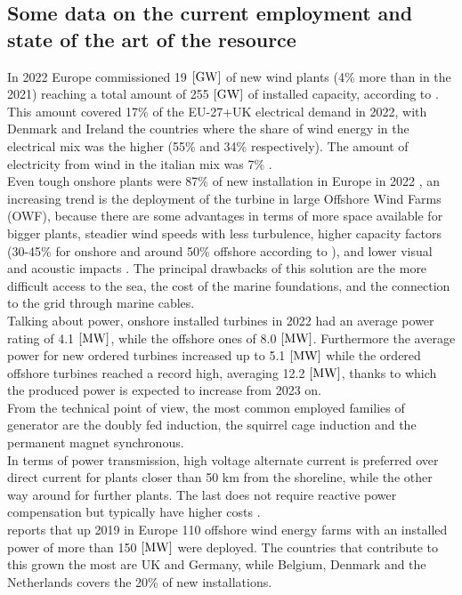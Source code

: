 \subsection{Some data on the current employment and state of the art of the resource}
In 2022 Europe commissioned 19 $\left[\si{\giga\watt}\right]$ of new wind plants (4\% more than in the 2021) reaching a total amount of 255 $\left[\si{\giga\watt}\right]$ of installed capacity, according to \cite{wind_europe_data_2022}. This amount covered 17\% of the EU-27+UK electrical demand in 2022, with Denmark and Ireland the countries where the share of wind energy in the electrical mix was the higher (55\% and 34\% respectively). The amount of electricity from wind in the italian mix was 7\% \cite{wind_europe_data_2022}.\\
Even tough onshore plants were 87\% of new installation in Europe in 2022 \cite{wind_europe_data_2022}, an increasing trend is the deployment of the turbine in large Offshore Wind Farms (OWF), because there are some advantages in terms of more space available for bigger plants, steadier wind speeds with less turbulence, higher capacity factors (30-45\% for onshore and around 50\% offshore according to \cite{wind_europe_data_2022}), and lower visual and acoustic impacts \cite{current_staus_and_future_trends_of_offshore_wind_power_in_europe}. The principal drawbacks of this solution are the more difficult access to the sea, the cost of the marine foundations, and the connection to the grid through marine cables.  \\
Talking about power, onshore installed turbines in 2022 had an average power rating of 4.1 $\left[\si{\mega\watt}\right]$, while the offshore ones of 8.0 $\left[\si{\mega\watt}\right]$. Furthermore the average power for new ordered turbines increased up to 5.1 $\left[\si{\mega\watt}\right]$ while the ordered offshore turbines reached a record high, averaging 12.2 $\left[\si{\mega\watt}\right]$, thanks to which the produced power is expected to increase from 2023 on.\\

From the technical point of view, the most common employed families of generator are the doubly fed induction, the squirrel cage induction and the permanent magnet synchronous.\\
In terms of power transmission, high voltage alternate current is preferred over direct current for plants closer than 50 km from the shoreline, while the other way around for further plants. The last does not require reactive power compensation but typically have higher costs \cite{current_staus_and_future_trends_of_offshore_wind_power_in_europe}.\\
\cite{current_staus_and_future_trends_of_offshore_wind_power_in_europe} reports that up 2019 in Europe 110 offshore wind energy farms with an installed power of more than 150 $\left[\si{\mega\watt}\right]$ were deployed. The countries that contribute to this grown the most are UK and Germany, while Belgium, Denmark and the Netherlands covers the 20\% of new installations.

